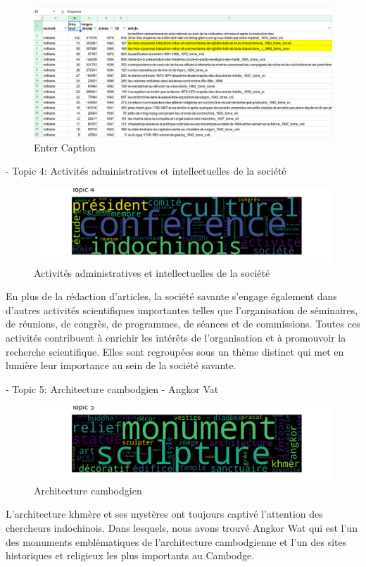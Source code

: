 \begin{figure}[H] %
    \centering
    \includegraphics[width=1\linewidth]{img/millitaire.PNG}
    \caption{Enter Caption}
    \label{fig:enter-label}
\end{figure}

- Topic 4:  Activités administratives et intellectuelles de la société
\begin{figure}[H] %
    \centering
    \includegraphics[width=14cm]{img/final_6_topic 4 .png}
    \caption{Activités administratives et intellectuelles de la société }
    \label{tp4}
\end{figure}

En plus de la rédaction d'articles, la société savante s'engage également dans d'autres activités scientifiques importantes telles que l'organisation de séminaires, de réunions, de congrès, de programmes, de séances et de commissions. Toutes ces activités contribuent à enrichir les intérêts de l'organisation et à promouvoir la recherche scientifique. Elles sont regroupées sous un thème distinct qui met en lumière leur importance au sein de la société savante.


- Topic 5: Architecture cambodgien  - Angkor Vat

\begin{figure}[H] %
    \centering
    \includegraphics[width=14cm]{img/final_6_topic 5 .png}
    \caption{Architecture cambodgien }
    \label{tp5}
\end{figure}
L'architecture khmère et ses mystères ont toujours captivé l'attention des chercheurs indochinois. Dans lesquels, nous avons trouvé Angkor Wat qui est l'un des monuments emblématiques de l'architecture cambodgienne et l'un des sites historiques et religieux les plus importants au Cambodge.

